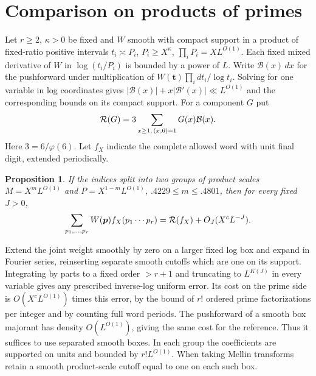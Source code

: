 \documentclass[11pt,a4paper]{article}
\theoremstyle{paperplain}
\newtheorem{proposition}[theorem]{Proposition}
\numberwithin{equation}{section}
\begin{document}
\section{Comparison on products of primes}\label{six:setup}
Let $r\ge2$, $\kappa>0$ be fixed and $W$ smooth with compact support in a product of
fixed-ratio positive intervals $t_i\asymp P_i$, $P_i\ge X^\kappa$,
$\prod_i P_i=XL^{O(1)}$. Each fixed mixed derivative of $W$ in
$\log(t_i/P_i)$ is bounded by a power of $L$. Write $\mathcal B(x)\,dx$
for the pushforward under multiplication of $W(\boldsymbol t)
\prod_i dt_i/\log t_i$. Solving for one variable in log coordinates gives
$|\mathcal B(x)|+x|\mathcal B'(x)|\ll L^{O(1)}$ and the corresponding
bounds on its compact support. For a component $G$ put
\[
 {\cal R}(G)=3\sum_{x\ge1,\,(x,6)=1}G(x)\mathcal B(x).
\]
Here $3=6/\varphi(6)$. Let $f_X$ indicate the complete allowed word
with unit final digit, extended periodically.
\begin{proposition}\label{six:box}
If the indices split into two groups of product scales
$M=X^m L^{O(1)}$ and $P=X^{1-m}L^{O(1)}$, $.4229\le m\le.4801$,
then for every fixed $J>0$,
\[
 \sum_{p_1,\ldots,p_r} W(\boldsymbol p) f_X(p_1\cdots p_r)
       ={\cal R}(f_X)+O_J(X^cL^{-J}).
\]
\end{proposition}
Extend the joint weight smoothly by zero on a larger fixed log box
and expand in Fourier series, reinserting separate smooth cutoffs which
are one on its support. Integrating by parts to a fixed order $>r+1$
and truncating to $L^{K(J)}$ in every variable gives any prescribed
inverse-log uniform error. Its cost on the prime side is
$O(X^cL^{O(1)})$ times this error, by the bound of $r!$ ordered
prime factorizations per integer and by counting full word periods.
The pushforward of a smooth box majorant has density $O(L^{O(1)})$,
giving the same cost for the reference. Thus it suffices to use
separated smooth boxes. In each group the coefficients are supported
on units and bounded by $r! L^{O(1)}$. When taking Mellin transforms
retain a smooth product-scale cutoff equal to one on each such box.
\end{document}
